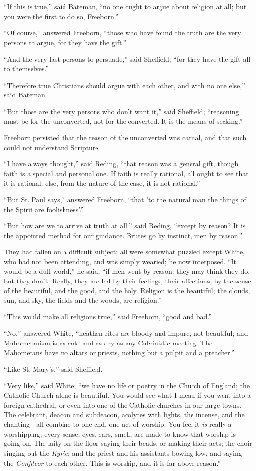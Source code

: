 ``If this is true,'' said Bateman, ``no one ought to
argue about religion at all; but you were the first to do so,
Freeborn.''

``Of course,'' answered Freeborn, ``those who have
found the truth are the very persons to argue, for they have the
gift.''

``And the very last persons to persuade,'' said Sheffield;
``for they have the gift all to themselves.''

``Therefore true Christians should argue with each other, and
with no one else,'' said Bateman.

``But those are the very persons who don't want it,'' said
Sheffield; ``reasoning must be for the unconverted, not for the
converted. It is the means of seeking.''

Freeborn persisted that the reason of the unconverted was carnal,
and that such could not understand Scripture.

``I have always thought,'' said Reding, ``that reason was a
general gift, though faith is a special and personal one. If faith is
really rational, all ought to see that it is rational; else, from the
nature of the case, it is not rational.''

``But St. Paul says,'' answered Freeborn, ``that 'to
the natural man the things of the Spirit are foolishness'.''

``But how are we to arrive at truth at all,'' said Reding,
``except by reason? It is the appointed method for our guidance.
Brutes go by instinct, men by reason.''

They had fallen on a difficult subject; all were somewhat puzzled
except White, who had not been attending, and was simply wearied; he
now interposed. ``It would be a dull world,'' he said,
``if men went by reason: they may think they do, but they don't.
Really, they are led by their feelings, their affections, by the sense
of the beautiful, and the good, and the holy. Religion is the
beautiful; the clouds, sun, and sky, the fields and the woods, are
religion.''

``This would make all religions true,'' said Freeborn,
``good and bad.''

``No,'' answered White, ``heathen rites are bloody and
impure, not beautiful; and Mahometanism is as cold and as dry as any
Calvinistic meeting. The Mahometans have no altars or priests, nothing
but a pulpit and a preacher.''

``Like St. Mary's,'' said Sheffield.

``Very like,'' said White; ``we have no life or poetry
in the Church of England; the Catholic Church alone is beautiful.
You would see what I mean if you went into a foreign cathedral, or
even into one of the Catholic churches in our large towns. The
celebrant, deacon and subdeacon, acolytes with lights, the incense,
and the chanting—all combine to one end, one act of worship. You
feel it \emph{is} really a worshipping; every sense, eyes, ears,
smell, are made to know that worship is going on. The laity on the
floor saying their beads, or making their acts; the choir singing out
the \emph{Kyrie}; and the priest and his assistants bowing low, and
saying the \emph{Confiteor} to each other. This is worship, and it is
far above reason.''


